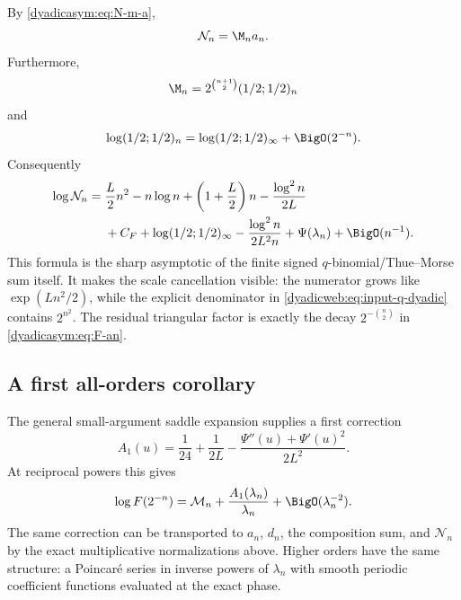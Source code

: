 \documentclass[11pt,oneside]{article}
\theoremstyle{definition}
\theoremstyle{remark}
\begin{document}
By \eqref{dyadicasym:eq:N-m-a},
\begin{equation}
 \mathcal N_n=\M_na_n.                                      \label{dyadicasym:eq:N-product}
\end{equation}
Furthermore,
\begin{equation}
 \M_n=2^{\binom{n+1}{2}}(1/2;1/2)_n                       \label{dyadicasym:eq:M-q}
\end{equation}
and
\begin{equation}
 \log(1/2;1/2)_n=
 \log(1/2;1/2)_\infty+\BigO(2^{-n}).                       \label{dyadicasym:eq:qpoch-limit}
\end{equation}
Consequently
\begin{align}
 \log\mathcal N_n={}&\frac L2n^2-n\log n+
 \left(1+\frac L2\right)n-\frac{\log^2n}{2L}              \notag\\
 &+C_F+\log(1/2;1/2)_\infty
 -\frac{\log^2n}{2L^2n}+\Psi(\lambda_n)
 +\BigO(n^{-1}).                                            \label{dyadicasym:eq:N-asymptotic}
\end{align}
This formula is the sharp asymptotic of the finite signed $q$-binomial/Thue--Morse sum itself.
It makes the scale cancellation visible: the numerator grows like
$\exp(Ln^2/2)$, while the explicit denominator in \eqref{dyadicweb:eq:input-q-dyadic} contains
$2^{n^2}$.  The residual triangular factor is exactly the decay
$2^{-\binom n2}$ in \eqref{dyadicasym:eq:F-an}.

\subsection{A first all-orders corollary}

The general small-argument saddle expansion supplies a first correction
\begin{equation}
 A_1(u)=\frac1{24}+\frac1{2L}
 -\frac{\Psi''(u)+\Psi'(u)^2}{2L^2}.                        \label{dyadicasym:eq:A1-report}
\end{equation}
At reciprocal powers this gives
\begin{equation}
 \log F(2^{-n})=\mathcal M_n+
 \frac{A_1(\lambda_n)}{\lambda_n}+
 \BigO(\lambda_n^{-2}).                                    \label{dyadicasym:eq:first-correction-dyadic}
\end{equation}
The same correction can be transported to $a_n$, $d_n$, the composition sum, and
$\mathcal N_n$ by the exact multiplicative normalizations above.  Higher orders have the same
structure: a Poincar\'e series in inverse powers of $\lambda_n$ with smooth periodic
coefficient functions evaluated at the exact phase.
\end{document}
